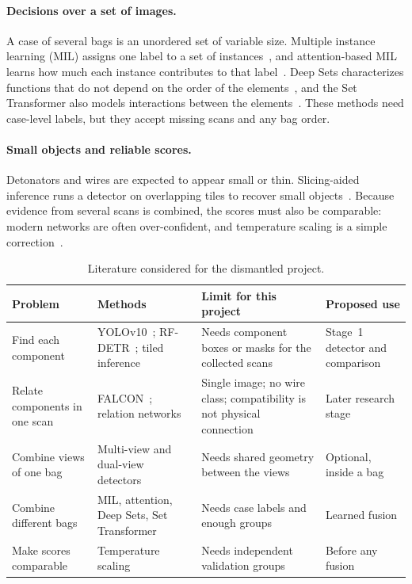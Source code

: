 \paragraph{Decisions over a set of images.}
A case of several bags is an unordered set of variable size. Multiple instance
learning (MIL) assigns one label to a set of instances~\citep{dietterich1997mil}, and
attention-based MIL learns how much each instance contributes to that
label~\citep{ilse2018attention}. Deep Sets characterizes functions that do not depend
on the order of the elements~\citep{zaheer2017deepsets}, and the Set Transformer also
models interactions between the elements~\citep{lee2019settransformer}. These methods
need case-level labels, but they accept missing scans and any bag order.

\paragraph{Small objects and reliable scores.}
Detonators and wires are expected to appear small or thin. Slicing-aided inference runs a detector on
overlapping tiles to recover small objects~\citep{akyon2022sahi}. Because evidence
from several scans is combined, the scores must also be comparable: modern networks
are often over-confident, and temperature scaling is a simple
correction~\citep{guo2017calibration}.

\begin{table}[htbp]
\centering\tablesetup
\caption{Literature considered for the dismantled project.}
\label{tab:litmethods}
\begin{tabularx}{\textwidth}{@{}L{0.2\textwidth}L{0.27\textwidth}YL{0.21\textwidth}@{}}
\toprule
Problem & Methods & Limit for this project & Proposed use\\
\midrule
Find each component & YOLOv10~\citep{wang2024yolov10};
RF-DETR~\citep{robinson2026rfdetr}; tiled inference~\citep{akyon2022sahi} &
Needs component boxes or masks for the collected scans & Stage~1 detector and
comparison\\
Relate components in one scan & FALCON~\citep{michael2026falcon}; relation
networks~\citep{hu2018relation} & Single image; no wire class; compatibility is not
physical connection & Later research stage\\
Combine views of one bag & Multi-view and dual-view
detectors~\citep{steitz2018multiview,isaacmedina2021epipolar,ma2024dvxray,tao2025ldxray}
& Needs shared geometry between the views & Optional, inside a bag\\
Combine different bags & MIL, attention, Deep Sets, Set
Transformer~\citep{dietterich1997mil,ilse2018attention,zaheer2017deepsets,lee2019settransformer}
& Needs case labels and enough groups & Learned fusion\\
Make scores comparable & Temperature scaling~\citep{guo2017calibration} & Needs
independent validation groups & Before any fusion\\
\bottomrule
\end{tabularx}
\end{table}

